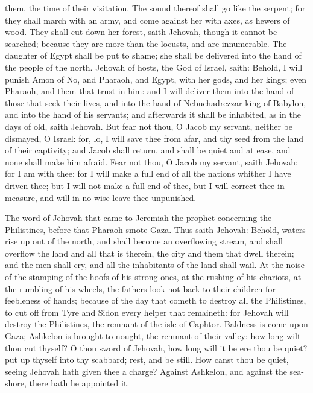 them, the time of their visitation. The sound thereof shall go like the serpent; for they shall march with an army, and come against her with axes, as hewers of wood. They shall cut down her forest, saith Jehovah, though it cannot be searched; because they are more than the locusts, and are innumerable. The daughter of Egypt shall be put to shame; she shall be delivered into the hand of the people of the north. Jehovah of hosts, the God of Israel, saith: Behold, I will punish Amon of No, and Pharaoh, and Egypt, with her gods, and her kings; even Pharaoh, and them that trust in him: and I will deliver them into the hand of those that seek their lives, and into the hand of Nebuchadrezzar king of Babylon, and into the hand of his servants; and afterwards it shall be inhabited, as in the days of old, saith Jehovah.  But fear not thou, O Jacob my servant, neither be dismayed, O Israel: for, lo, I will save thee from afar, and thy seed from the land of their captivity; and Jacob shall return, and shall be quiet and at ease, and none shall make him afraid. Fear not thou, O Jacob my servant, saith Jehovah; for I am with thee: for I will make a full end of all the nations whither I have driven thee; but I will not make a full end of thee, but I will correct thee in measure, and will in no wise leave thee unpunished. 

The word of Jehovah that came to Jeremiah the prophet concerning the Philistines, before that Pharaoh smote Gaza.  Thus saith Jehovah: Behold, waters rise up out of the north, and shall become an overflowing stream, and shall overflow the land and all that is therein, the city and them that dwell therein; and the men shall cry, and all the inhabitants of the land shall wail. At the noise of the stamping of the hoofs of his strong ones, at the rushing of his chariots, at the rumbling of his wheels, the fathers look not back to their children for feebleness of hands; because of the day that cometh to destroy all the Philistines, to cut off from Tyre and Sidon every helper that remaineth: for Jehovah will destroy the Philistines, the remnant of the isle of Caphtor. Baldness is come upon Gaza; Ashkelon is brought to nought, the remnant of their valley: how long wilt thou cut thyself? O thou sword of Jehovah, how long will it be ere thou be quiet? put up thyself into thy scabbard; rest, and be still. How canst thou be quiet, seeing Jehovah hath given thee a charge? Against Ashkelon, and against the sea-shore, there hath he appointed it. 

